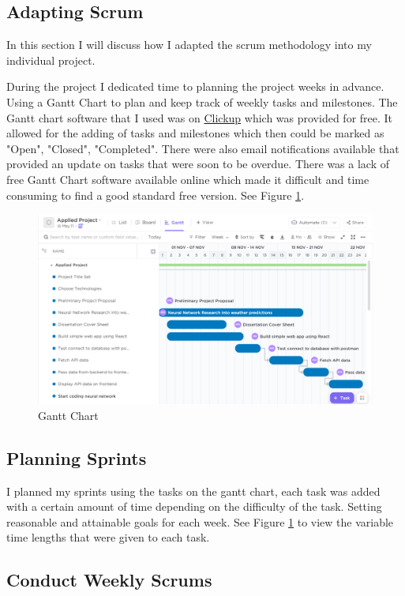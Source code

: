 \subsection{Adapting Scrum}
In this section I will discuss how I adapted the scrum methodology into my individual project. 

During the project I dedicated time to planning the project weeks in advance. Using a Gantt Chart to plan and keep track of weekly tasks and milestones. The Gantt chart software that I used was on \href{https://app.clickup.com}{Clickup} which was provided for free. It allowed for the adding of tasks and milestones which then could be marked as "Open", "Closed", "Completed". There were also email notifications available that provided an update on tasks that were soon to be overdue. There was a lack of free Gantt Chart software available online which made it difficult and time consuming to find a good standard free version. See Figure \ref{Gantt}.

\begin{figure}[h]
\centering
\includegraphics[scale=0.4]{img/GanttChart.PNG}
\caption{Gantt Chart}
\label{Gantt}
\end{figure}

\subsection{Planning Sprints}

I planned my sprints using the tasks on the gantt chart, each task was added with a certain amount of time depending on the difficulty of the task. Setting reasonable and attainable goals for each week. See Figure \ref{Gantt} to view the variable time lengths that were given to each task.

\subsection{Conduct Weekly Scrums}

